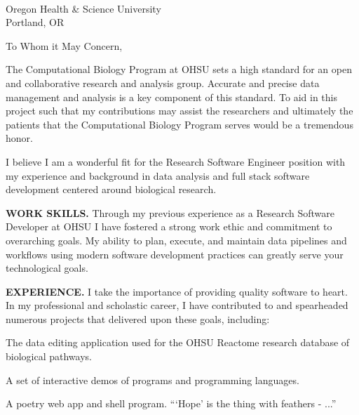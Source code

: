 



\textcolor{my-grey}{\dotfill}
\bigbreak

{\DTMtoday}\\
Oregon Health \& Science University\\
Portland, OR

\vspace*{2\baselineskip}

To Whom it May Concern,

\vspace*{\baselineskip}

The Computational Biology Program at OHSU sets a high standard for an open and collaborative research and analysis group. Accurate and precise data management and analysis is a key component of this standard. To aid in this project such that my contributions may assist the researchers and ultimately the patients that the Computational Biology Program serves would be a tremendous honor.

\vspace*{\baselineskip}

I believe I am a wonderful fit for the Research Software Engineer position with my experience and background in data analysis and full stack software development centered around biological research.

\vspace*{\baselineskip}

\textbf{WORK SKILLS.} Through my previous experience as a Research Software Developer at OHSU I have fostered a strong work ethic and commitment to overarching goals. My ability to plan, execute, and maintain data pipelines and workflows using modern software development practices can greatly serve your technological goals.

\vspace*{\baselineskip}

\textbf{EXPERIENCE.} I take the importance of providing quality software to heart. In my professional and scholastic career, I have contributed to and spearheaded numerous projects that delivered upon these goals, including:

\begin{itemize}[label=$\triangleright$]
The data editing application used for the OHSU Reactome research database of biological pathways.

A set of interactive demos of programs and programming languages.

A poetry web app and shell program. ```Hope' is the thing with feathers - ...''

\end{itemize}

